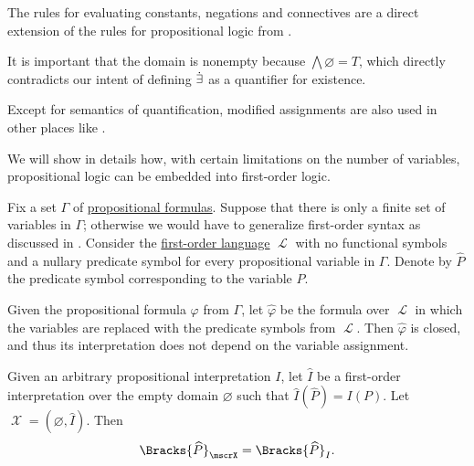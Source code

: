 \begin{comments}
  \item The rules for evaluating constants, negations and connectives are a direct extension of the rules for propositional logic from .

  \item It is important that the domain is nonempty because \( \bigwedge\varnothing = T \), which directly contradicts our intent of defining \( \dot\exists \) as a quantifier for existence.

  \item Except for semantics of quantification, modified assignments are also used in other places like .
\end{comments}

\begin{remark}\label{rem:propositional_logic_as_first_order_logic}
  We will show in details how, with certain limitations on the number of variables, propositional logic can be embedded into first-order logic.

  Fix a set \( \Gamma \) of \hyperref[def:propositional_syntax/formula]{propositional formulas}. Suppose that there is only a finite set of variables in \( \Gamma \); otherwise we would have to generalize first-order syntax as discussed in . Consider the \hyperref[def:first_order_language]{first-order language} \( \mscrL \) with no functional symbols and a nullary predicate symbol for every propositional variable in \( \Gamma \). Denote by \( \widehat{P} \) the predicate symbol corresponding to the variable \( P \).

  Given the propositional formula \( \varphi \) from \( \Gamma \), let \( \widehat \varphi \) be the formula over \( \mscrL \) in which the variables are replaced with the predicate symbols from \( \mscrL \). Then \( \widehat \varphi \) is closed, and thus its interpretation does not depend on the variable assignment.

  Given an arbitrary propositional interpretation \( I \), let \( \widehat{I} \) be a first-order interpretation over the empty domain \( \varnothing \) such that \( \widehat{I}(\widehat{P}) = I(P) \). Let \( \mscrX = (\varnothing, \widehat{I}) \). Then
  \begin{equation*}
    \Bracks{\widehat{P}}_\mscrX = \Bracks{\widehat{P}}_I.
  \end{equation*}
\end{remark}

